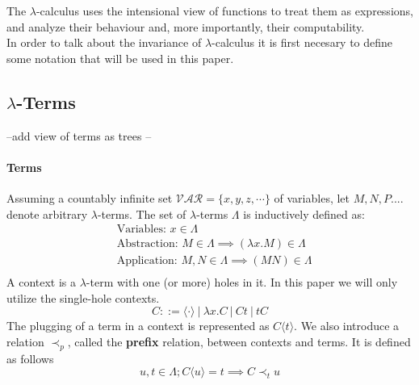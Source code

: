 \documentclass[11pt]{article}
\begin{document}
The $\lambda$-calculus uses the intensional view of functions to treat them as expressions, and analyze their behaviour and, more importantly, their computability. \\
In order to talk about the invariance of $\lambda$-calculus it is first necesary to define some notation that will be used in this paper.
\subsection{$\lambda$-Terms}
--add view of terms as trees --
\paragraph{Terms} Assuming a countably infinite set $\mathcal{VAR} = \{ x, y, z, \cdots \}$ of variables, let $M, N, P....$ denote arbitrary $\lambda$-terms. The set of $\lambda$-terms $\Lambda$ is inductively defined as:
\begin{equation*}
  \begin{split}
  & \text{Variables: } x \in \Lambda \\
  & \text{Abstraction: } M \in \Lambda \implies ( \lambda x.M ) \in \Lambda \\
  & \text{Application: } M, N \in \Lambda \implies (M N) \in \Lambda \\
  \end{split}
\end{equation*}
A context is a $\lambda$-term with one (or more) holes in it. In this paper we will only utilize the single-hole contexts.
\begin{equation*}
C ::= \langle \cdot \rangle \ | \ \lambda x.C \ | \ Ct \ | \ tC
\end{equation*}
The plugging of a term in a context is represented as $C\langle t \rangle$.
We also introduce a relation $\prec_p$, called the \textbf{prefix} relation, between contexts and terms. It is defined as follows
\begin{equation*}
  u,t \in \Lambda ; C \langle u \rangle = t \implies C \prec_t u
\end{equation*}
\end{document}

